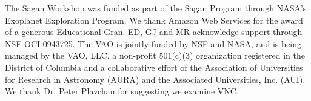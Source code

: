 \acknowledgements The Sagan Workshop was funded as part of the Sagan Program through NASA's Exoplanet Exploration Program. We thank Amazon Web Services for the award of a generous Educational Gran. ED, GJ and MR acknowledge support through NSF OCI-0943725. The VAO is jointly funded by NSF and NASA, and is being managed by the VAO, LLC, a non-profit 501(c)(3) organization registered in the District of Columbia and a collaborative effort of the Association of Universities for Research in Astronomy (AURA) and the Associated Universities, Inc. (AUI). We thank Dr. Peter Plavchan for suggesting we examine VNC.
